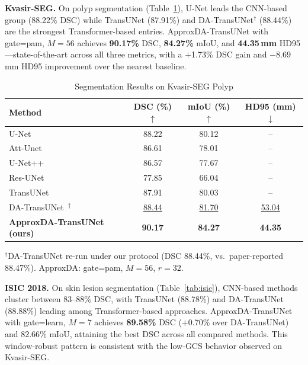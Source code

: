 \textbf{Kvasir-SEG.} On polyp segmentation (Table~\ref{tab:kvasir}), U-Net leads the CNN-based group (88.22\% DSC) while TransUNet (87.91\%) and DA-TransUNet$^\dag$ (88.44\%) are the strongest Transformer-based entries. ApproxDA-TransUNet with gate=pam, $M{=}56$ achieves \textbf{90.17\%} DSC, \textbf{84.27\%} mIoU, and \textbf{44.35\,mm} HD95---state-of-the-art across all three metrics, with a $+$1.73\% DSC gain and $-$8.69\,mm HD95 improvement over the nearest baseline.

\begin{table}[ht]
  \caption{Segmentation Results on Kvasir-SEG Polyp}
  \label{tab:kvasir}
  \begin{center}
  \setlength{\tabcolsep}{3pt}
  \begin{tabular}{lccc}
    \toprule
    Method & DSC (\%) $\uparrow$ & mIoU (\%) $\uparrow$ & HD95 (mm) $\downarrow$ \\
    \midrule
    U-Net~\cite{ronneberger2015unet}           & 88.22 & 80.12 & -- \\
    Att-Unet~\cite{oktay2018attention}         & 86.61 & 78.01 & -- \\
    U-Net++~\cite{zhou2018unetpp}              & 86.57 & 77.67 & -- \\
    Res-UNet~\cite{diakogiannis2020resunet}    & 77.85 & 66.04 & -- \\
    TransUNet~\cite{chen2021transunet}         & 87.91 & 80.03 & -- \\
    DA-TransUNet~\cite{sun2024datransunet}$^\dag$ & \underline{88.44} & \underline{81.70} & \underline{53.04} \\
    \midrule
    \textbf{ApproxDA-TransUNet (ours)}         & \textbf{90.17} & \textbf{84.27} & \textbf{44.35} \\
    \bottomrule
  \end{tabular}
  \end{center}
  \vspace{-0.3em}
  \footnotesize{$^\dag$DA-TransUNet re-run under our protocol (DSC 88.44\%, vs.\ paper-reported 88.47\%). ApproxDA: gate=pam, $M{=}56$, $r{=}32$.}
\end{table}

\textbf{ISIC 2018.} On skin lesion segmentation (Table~\ref{tab:isic}), CNN-based methods cluster between 83--88\% DSC, with TransUNet (88.78\%) and DA-TransUNet (88.88\%) leading among Transformer-based approaches. ApproxDA-TransUNet with gate=learn, $M{=}7$ achieves \textbf{89.58\%} DSC ($+$0.70\% over DA-TransUNet) and 82.66\% mIoU, attaining the best DSC across all compared methods. This window-robust pattern is consistent with the low-GCS behavior observed on Kvasir-SEG.

